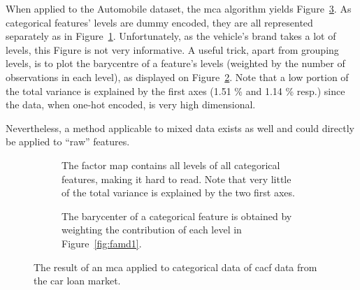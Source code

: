 When applied to the Automobile dataset, the \gls{mca} algorithm yields Figure~\ref{fig:mca}. As categorical features' levels are dummy encoded, they are all represented separately as in Figure~\ref{fig:mca1}. Unfortunately, as the vehicle's brand takes a lot of levels, this Figure is not very informative. A useful trick, apart from grouping levels, is to plot the barycentre of a feature's levels (weighted by the number of observations in each level), as displayed on Figure~\ref{fig:mca2}. Note that a low portion of the total variance is explained by the first axes (1.51 \% and 1.14 \% resp.) since the data, when one-hot encoded, is very high dimensional.

Nevertheless, a method applicable to mixed data exists as well and could directly be applied to ``raw'' features.

\begin{figure}[!htb]
{\setlength{\parindent}{0cm}}

\begin{multicols}{2}
\centering
\begin{subfigure}[t]{0.45\textwidth}
\centering
\resizebox{\textwidth}{!}{}
\caption{\label{fig:mca1} The factor map contains all levels of all categorical features, making it hard to read. Note that very little of the total variance is explained by the two first axes.}
\end{subfigure}%
\columnbreak
\hspace*{1cm} \begin{subfigure}[t]{0.45\textwidth}
\centering
\resizebox{\textwidth}{!}{}
\caption{\label{fig:mca2} The barycenter of a categorical feature is obtained by weighting the contribution of each level in Figure~\ref{fig:famd1}.}
\end{subfigure}
\end{multicols}

\caption{\label{fig:mca} The result of an \gls{mca} applied to categorical data of \gls{cacf} data from the car loan market.}
\end{figure}

\paragraph{}


